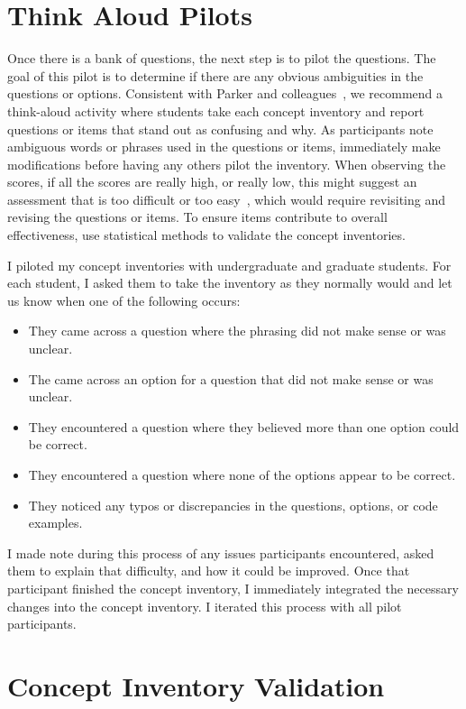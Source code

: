 \section{Think Aloud Pilots}
Once there is a bank of questions, the next step is to pilot the questions. The goal of this pilot is to determine if there are any obvious ambiguities in the questions or options. Consistent with Parker and colleagues~\cite{parker2016replication}, we recommend a think-aloud activity where students take each concept inventory and report questions or items that stand out as confusing and why. As participants note ambiguous words or phrases used in the questions or items, immediately make modifications before having any others pilot the inventory. When observing the scores, if all the scores are really high, or really low, this might suggest an assessment that is too difficult or too easy~\cite{nelson1967testing}, which would require revisiting and revising the questions or items. To ensure items contribute to overall effectiveness, use statistical methods to validate the concept inventories.

I piloted my concept inventories with undergraduate and graduate students. For each student, I asked them to take the inventory as they normally would and let us know when one of the following occurs:
	
	\begin{itemize}
		\item They came across a question where the phrasing did not make sense or was unclear.
		\item The came across an option for a question that did not make sense or was unclear.
		\item They encountered a question where they believed more than one option could be correct.
		\item They encountered a question where none of the options appear to be correct.
		\item They noticed any typos or discrepancies in the questions, options, or code examples.
	\end{itemize}
	
I made note during this process of any issues participants encountered, asked them to explain that difficulty, and how it could be improved. Once that participant finished the concept inventory, I immediately integrated the necessary changes into the concept inventory. I iterated this process with all pilot participants.

\section{Concept Inventory Validation}

